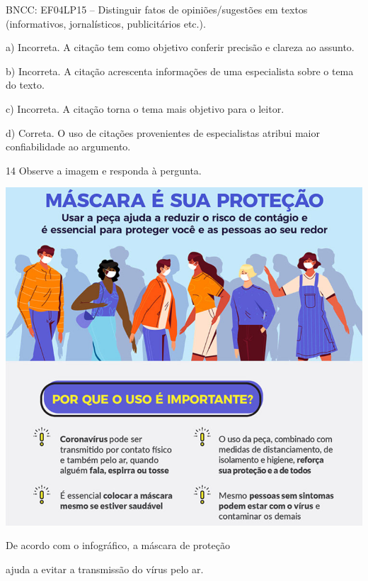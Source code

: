 \begin{escolha}
\begin{escolha}
\begin{escolha}
{BNCC: EF04LP15 -- Distinguir fatos de opiniões/sugestões em textos
(informativos, jornalísticos, publicitários etc.).

a) Incorreta. A citação tem como objetivo conferir precisão e clareza
ao assunto.

b) Incorreta. A citação acrescenta informações de uma especialista 
sobre o tema do texto.

c) Incorreta. A citação torna o tema mais objetivo para o leitor.

d) Correta. O uso de citações provenientes de especialistas
atribui maior confiabilidade ao argumento.}

\num{14} Observe a imagem e responda à pergunta.

\includegraphics{./imgQ4PORT/media/image2.png}


De acordo com o infográfico, a máscara de proteção

\begin{escolha}
  \item ajuda a evitar a transmissão do vírus pelo ar.


\end{escolha}
\end{escolha}
\end{escolha}
\end{escolha}
